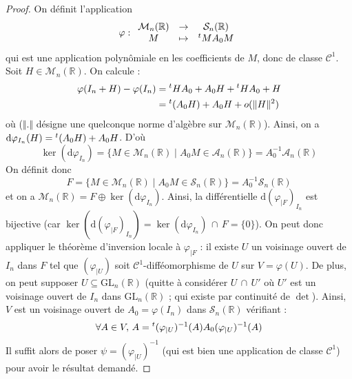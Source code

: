 	\begin{proof}
		On définit l'application
		\[ \varphi :
		\begin{array}{ccc}
			\mathcal{M}_n(\mathbb{R}) &\rightarrow& \mathcal{S}_n(\mathbb{R}) \\
			M &\mapsto& \mathstrut ^t M A_0 M
		\end{array}
		\]
		qui est une application polynômiale en les coefficients de $M$, donc de classe $\mathcal{C}^1$. Soit $H \in \mathcal{M}_n(\mathbb{R})$. On calcule :
		\begin{align*}
			\varphi(I_n + H) - \varphi(I_n) &= \mathstrut ^t H A_0 + A_0 H + \mathstrut ^t H A_0 + H \\
			&= \mathstrut ^t (A_0 H) + A_0 H + o(\Vert H \Vert^2)
		\end{align*}
		où ($\Vert . \Vert$ désigne une quelconque norme d'algèbre sur $\mathcal{M}_n(\mathbb{R})$). Ainsi, on a $\mathrm{d} \varphi_{I_n}(H) = \mathstrut ^t (A_0 H) + A_0 H$. D'où
		\[ \ker(\mathrm{d} \varphi_{I_n}) = \{ M \in \mathcal{M}_n(\mathbb{R}) \mid A_0 M \in \mathcal{A}_n(\mathbb{R}) \} = A_0^{-1} \mathcal{A}_n(\mathbb{R}) \]
		On définit donc
		\[ F = \{ M \in \mathcal{M}_n(\mathbb{R}) \mid A_0 M \in \mathcal{S}_n(\mathbb{R}) \} = A_0^{-1} \mathcal{S}_n(\mathbb{R})  \]
		et on a $\mathcal{M}_n(\mathbb{R}) = F \oplus \ker(\mathrm{d} \varphi_{I_n})$. Ainsi, la différentielle $\mathrm{d} (\varphi_{|F})_{I_n}$ est bijective (car $\ker(\mathrm{d} (\varphi_{|F})_{I_n}) = \ker(\mathrm{d} \varphi_{I_n}) \, \cap \, F = \{ 0 \}$).
		\newpar
		On peut donc appliquer le théorème d'inversion locale à $\varphi_{|F}$ : il existe $U$ un voisinage ouvert de $I_n$ dans $F$ tel que $(\varphi_{|U})$ soit $\mathcal{C}^1$-difféomorphisme de $U$ sur $V = \varphi(U)$. De plus, on peut supposer $U \subseteq \mathrm{GL}_n(\mathbb{R})$ (quitte à considérer $U \, \cap \, U'$ où $U'$ est un voisinage ouvert de $I_n$ dans $\mathrm{GL}_n(\mathbb{R})$ ; qui existe par continuité de $\det$).
		\newpar
		Ainsi, $V$ est un voisinage ouvert de $A_0 = \varphi(I_n)$ dans $\mathcal{S}_n(\mathbb{R})$ vérifiant :
		\[ \forall A \in V, \, A = \mathstrut ^t (\varphi_{|U})^{-1}(A) A_0 (\varphi_{|U})^{-1}(A) \]
		Il suffit alors de poser $\psi = (\varphi_{|U})^{-1}$ (qui est bien une application de classe $\mathcal{C}^1$) pour avoir le résultat demandé.
	\end{proof}


